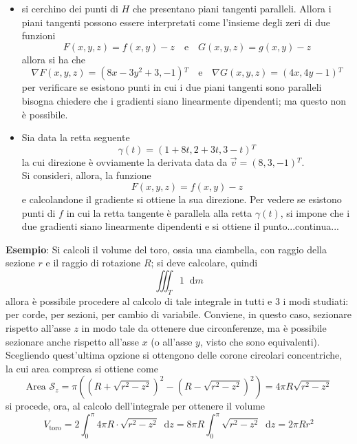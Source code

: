 \documentclass[a4paper]{extarticle}
\newcommand*\dif{\mathop{}\!\mathrm{d}}
\begin{document}
\begin{itemize}
    \item si cerchino dei punti di $H$ che presentano piani tangenti paralleli. Allora i piani tangenti possono essere interpretati come l'insieme degli zeri di due funzioni
    \[F(x,y,z)=f(x,y)-z \hspace{1em} \text{e} \hspace{1em} G(x,y,z)=g(x,y)-z\]
    allora si ha che
    \[\nabla F(x,y,z) = (8x-3y^2+3,-1){^T} \hspace{1em} \text{e} \hspace{1em} \nabla G(x,y,z) = (4x,4y-1){^T}\]
    per verificare se esistono punti in cui i due piani tangenti sono paralleli bisogna chiedere che i gradienti siano linearmente dipendenti; ma questo non è possibile.

    \item Sia data la retta seguente
    \[\gamma(t)=(1+8t,2+3t,3-t){^T}\]
    la cui direzione è ovviamente la derivata data da $\vec v = (8,3,-1){^T}$.\\
    Si consideri, allora, la funzione
    \[F(x,y,z)=f(x,y)-z\]
    e calcolandone il gradiente si ottiene la sua direzione. Per vedere se esistono punti di $f$ in cui la retta tangente è parallela alla retta $\gamma(t)$, si impone che i due gradienti siano linearmente dipendenti e si ottiene il punto...continua...
\end{itemize}

\vspace{2em}
\noindent
\textbf{Esempio}: Si calcoli il volume del toro, ossia una ciambella, con raggio della sezione $r$ e il raggio di rotazione $R$; si deve calcolare, quindi
\[\iiint_T 1 \dif m\]
allora è possibile procedere al calcolo di tale integrale in tutti e $3$ i modi studiati: per corde, per sezioni, per cambio di variabile. Conviene, in questo caso, sezionare rispetto all'asse $z$ in modo tale da ottenere due circonferenze, ma è possibile sezionare anche rispetto all'asse $x$ (o all'asse $y$, visto che sono equivalenti). Scegliendo quest'ultima opzione si ottengono delle corone circolari concentriche, la cui area compresa si ottiene come
\[\text{Area } \mathcal{S}_z = \pi \left( (R+\sqrt{r^2-z^2})^2 - (R-\sqrt{r^2-z^2})^2\right) = 4 \pi R \sqrt{r^2 - z^2}\]
si procede, ora, al calcolo dell'integrale per ottenere il volume
\[V_\text{toro} = 2 \int_0^\pi 4 \pi R \cdot \sqrt{r^2-z^2} \dif z = 8 \pi R \int_0^\pi \sqrt{r^2-z^2} \dif z = 2 \pi R r^2\]

\vspace{1em}
\noindent
\end{document}

